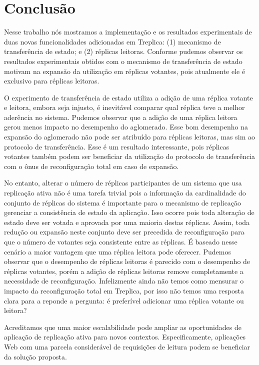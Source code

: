 \chapter*[Conclusão]{Conclusão}\label{conclusao}

Nesse trabalho nós mostramos a implementação e os resultados experimentais de duas novas
funcionalidades adicionadas em Treplica: (1) mecanismo de transferência de estado; e (2)
réplicas leitoras. Conforme pudemos observar os resultados experimentais obtidos com o
mecanismo de transferência de estado motivam na expansão da utilização em réplicas
votantes, pois atualmente ele é exclusivo para réplicas leitoras.

O experimento de transferência de estado utiliza a adição de uma réplica votante e
leitora, embora seja injusto, é inevitável comparar qual réplica teve a melhor aderência
no sistema. Pudemos observar que a adição de uma réplica leitora gerou menos impacto no
desempenho do aglomerado. Esse bom desempenho na expansão do aglomerado não pode ser
atribuído para réplicas leitoras, mas sim ao protocolo de transferência. Esse é um
resultado interessante, pois réplicas votantes também podem ser beneficiar da utilização
do protocolo de transferência com o ônus de reconfiguração total \cite{lamport10} em
caso de expansão.

No entanto, alterar o número de réplicas participantes de um sistema que usa replicação
ativa não é uma tarefa trivial pois a informação da cardinalidade do conjunto de réplicas
do sistema é importante para o mecanismo de replicação gerenciar a consistência de estado
da aplicação. Isso ocorre pois toda alteração de estado deve ser votada e aprovada por uma
maioria destas réplicas. Assim, toda redução ou expansão neste conjunto deve ser precedida
de reconfiguração para que o número de votantes seja consistente entre as réplicas. É
baseado nesse cenário a maior vantagem que uma réplica leitora pode oferecer. Pudemos
observar que o desempenho de réplicas leitoras é parecido com o desempenho de réplicas
votantes, porém a adição de réplicas leitoras remove completamente a necessidade de
reconfiguração. Infelizmente ainda não temos como mensurar o impacto da reconfiguração
total em Treplica, por isso não temos uma resposta clara para a reponde a pergunta: é
preferível adicionar uma réplica votante ou leitora?

Acreditamos que uma maior escalabilidade pode ampliar as oportunidades de aplicação de
replicação ativa para novos contextos. Especificamente, aplicações Web com uma parcela
considerável de requisições de leitura podem se beneficiar da solução proposta.

